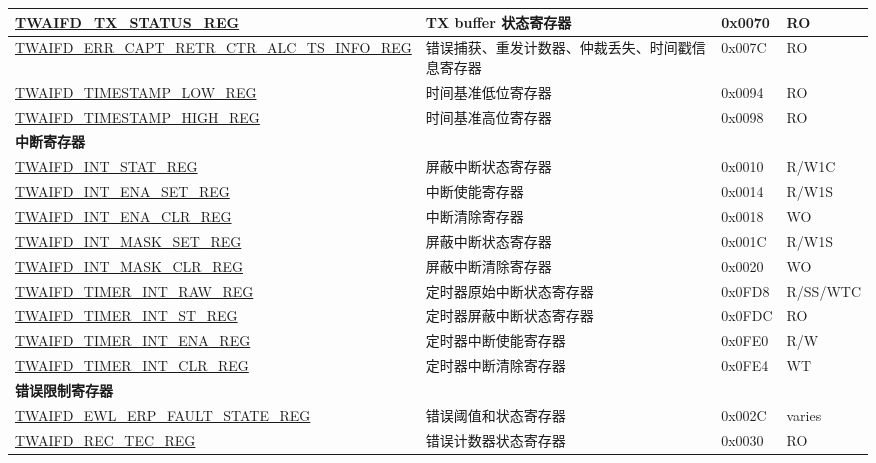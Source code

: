 \begin{longtable}{ | p{6cm} | p{7.2cm} | p{1.3cm} | p{1.5cm} | }
\hyperref[regdesc:TWAIFDTXSTATUSREG]{TWAIFD\_TX\_STATUS\_REG} & TX buffer 状态寄存器 & 0x0070 & RO \\ \hline
\hyperref[regdesc:TWAIFDERRCAPTRETRCTRALCTSINFOREG]{TWAIFD\_ERR\_CAPT\_RETR\_CTR\_ALC\newline \_TS\_INFO\_REG} & 错误捕获、重发计数器、仲裁丢失、时间戳信息寄存器 & 0x007C & RO \\ \hline
\hyperref[regdesc:TWAIFDTIMESTAMPLOWREG]{TWAIFD\_TIMESTAMP\_LOW\_REG} & 时间基准低位寄存器 & 0x0094 & RO \\ \hline
\hyperref[regdesc:TWAIFDTIMESTAMPHIGHREG]{TWAIFD\_TIMESTAMP\_HIGH\_REG} & 时间基准高位寄存器 & 0x0098 & RO \\ \hline
\multicolumn{4}{|l|}{\textbf{中断寄存器}} \\ \hline
\hyperref[regdesc:TWAIFDINTSTATREG]{TWAIFD\_INT\_STAT\_REG} & 屏蔽中断状态寄存器  & 0x0010 & R/W1C \\ \hline
\hyperref[regdesc:TWAIFDINTENASETREG]{TWAIFD\_INT\_ENA\_SET\_REG} & 中断使能寄存器 & 0x0014 & R/W1S \\ \hline
\hyperref[regdesc:TWAIFDINTENACLRREG]{TWAIFD\_INT\_ENA\_CLR\_REG} & 中断清除寄存器 & 0x0018 & WO \\ \hline
\hyperref[regdesc:TWAIFDINTMASKSETREG]{TWAIFD\_INT\_MASK\_SET\_REG} & 屏蔽中断状态寄存器 & 0x001C & R/W1S \\ \hline
\hyperref[regdesc:TWAIFDINTMASKCLRREG]{TWAIFD\_INT\_MASK\_CLR\_REG} & 屏蔽中断清除寄存器  & 0x0020 & WO \\ \hline
\hyperref[regdesc:TWAIFDTIMERINTRAWREG]{TWAIFD\_TIMER\_INT\_RAW\_REG} & 定时器原始中断状态寄存器  & 0x0FD8 & R/SS/WTC \\ \hline
\hyperref[regdesc:TWAIFDTIMERINTSTREG]{TWAIFD\_TIMER\_INT\_ST\_REG} & 定时器屏蔽中断状态寄存器 & 0x0FDC & RO \\ \hline
\hyperref[regdesc:TWAIFDTIMERINTENAREG]{TWAIFD\_TIMER\_INT\_ENA\_REG} & 定时器中断使能寄存器 & 0x0FE0 & R/W \\ \hline
\hyperref[regdesc:TWAIFDTIMERINTCLRREG]{TWAIFD\_TIMER\_INT\_CLR\_REG} & 定时器中断清除寄存器 & 0x0FE4 & WT \\ \hline
\multicolumn{4}{|l|}{\textbf{错误限制寄存器}} \\ \hline
\hyperref[regdesc:TWAIFDEWLERPFAULTSTATEREG]{TWAIFD\_EWL\_ERP\_FAULT\_STATE\_REG} & 错误阈值和状态寄存器 & 0x002C & varies \\ \hline
\hyperref[regdesc:TWAIFDRECTECREG]{TWAIFD\_REC\_TEC\_REG} & 错误计数器状态寄存器 & 0x0030 & RO \\ \hline

\end{longtable}
